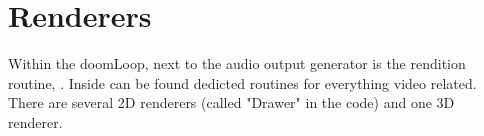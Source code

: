 \section{Renderers}
Within the doomLoop, next to the audio output generator is the rendition routine, . Inside can be found dedicted routines for everything video related. There are several 2D renderers (called "Drawer" in the code) and one 3D renderer.\\
\par
{}